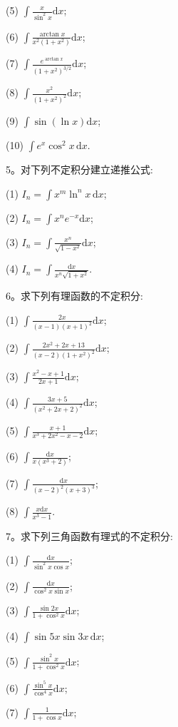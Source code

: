 (5) $\displaystyle \int\frac{x}{\sin^2x}\mathrm dx$;

(6) $\displaystyle \int\frac{\arctan x}{x^2(1+x^2)}\mathrm dx$;

(7) $\displaystyle \int\frac{e^{\arctan x}}{(1+x^2)^{3/2}}\mathrm dx$;

(8) $\displaystyle \int\frac{x^2}{(1+x^2)^2}\mathrm dx$;

(9) $\displaystyle \int\sin(\ln x)\mathrm dx$;

(10) $\displaystyle \int e^x\cos^2x\,\mathrm dx$.

5。对下列不定积分建立递推公式:

(1) $\displaystyle I_n=\int x^m\ln^nx\,\mathrm dx$;

(2) $\displaystyle I_n=\int x^ne^{-x}\mathrm dx$;

(3) $\displaystyle I_n=\int\frac{x^n}{\sqrt{1-x^2}}\mathrm dx$;

(4) $\displaystyle I_n=\int\frac{\mathrm dx}{x^n\sqrt{1+x^2}}$.

6。求下列有理函数的不定积分:

(1) $\displaystyle \int\frac{2x}{(x-1)(x+1)^2}\mathrm dx$;

(2) $\displaystyle \int\frac{2x^2+2x+13}{(x-2)(1+x^2)^2}\mathrm dx$;

(3) $\displaystyle \int\frac{x^2-x+1}{2x+1}\mathrm dx$;

(4) $\displaystyle \int\frac{3x+5}{(x^2+2x+2)^2}\mathrm dx$;

(5) $\displaystyle \int\frac{x+1}{x^3+2x^2-x-2}\mathrm dx$;

(6) $\displaystyle \int\frac{\mathrm dx}{x(x^3+2)}$;

(7) $\displaystyle \int\frac{\mathrm dx}{(x-2)^2(x+3)^3}$;

(8) $\displaystyle \int\frac{x\mathrm dx}{x^3-1}$.

7。求下列三角函数有理式的不定积分:

(1) $\displaystyle \int\frac{\mathrm dx}{\sin^2x\cos x}$;

(2) $\displaystyle \int\frac{\mathrm dx}{\cos^2x\sin x}$;

(3) $\displaystyle \int\frac{\sin2x}{1+\cos^2x}\mathrm dx$;

(4) $\displaystyle \int\sin5x\sin3x\,\mathrm dx$;

(5) $\displaystyle \int\frac{\sin^2x}{1+\cos^2x}\mathrm dx$;

(6) $\displaystyle \int\frac{\sin^5x}{\cos^4x}\mathrm dx$;

(7) $\displaystyle \int\frac1{1+\cos x}\mathrm dx$;

